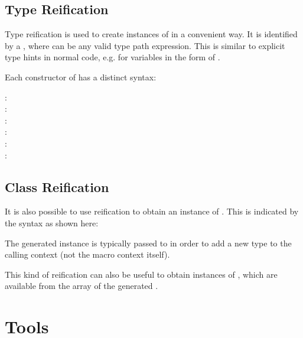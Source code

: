 \documentclass{haxe}
\begin{document}
\subsection{Type Reification}
\label{macro-reification-type}

Type reification is used to create instances of  in a convenient way. It is identified by a , where  can be any valid type path expression. This is similar to explicit type hints in normal code, e.g. for variables in the form of .

Each constructor of  has a distinct syntax:

\begin{description}
	\item[:] 
	\item[:] 
	\item[:] 
	\item[:] 
	\item[:] 
	\item[:] 
\end{description}

\subsection{Class Reification}
\label{macro-reification-class}

It is also possible to use reification to obtain an instance of . This is indicated by the  syntax as shown here:


The generated  instance is typically passed to  in order to add a new type to the calling context (not the macro context itself).

This kind of reification can also be useful to obtain instances of , which are available from the  array of the generated . 

\section{Tools}
\label{macro-tools}
\end{document}
